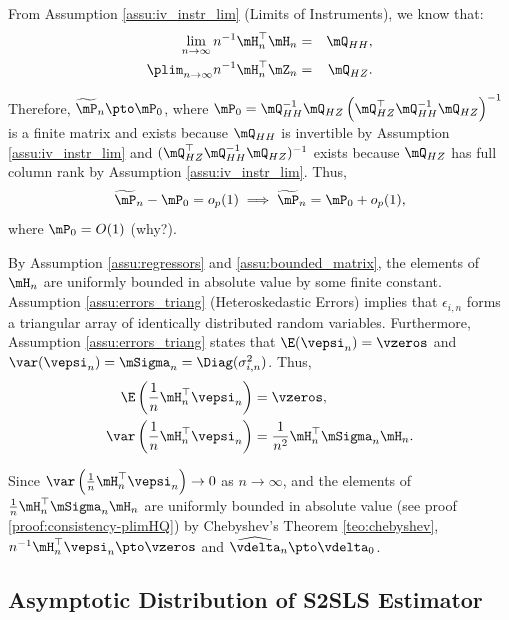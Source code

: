 \documentclass[english,12pt]{book}\usepackage[]{graphicx}\usepackage[]{xcolor}
\begin{document}
From Assumption \ref{assu:iv_instr_lim} (Limits of Instruments), we know that:
\begin{eqnarray*}
\lim_{n\to \infty} n^{-1}\mH_n^\top\mH_n &=& \mQ_{HH},\\
\plim_{n\to \infty} n^{-1}\mH_n^\top\mZ_n &=& \mQ_{HZ}.
\end{eqnarray*}

Therefore,  $\widetilde{\mP}_n\pto \mP_0$, where $\mP_0=\mQ_{HH}^{-1}\mQ_{HZ}\left(\mQ_{HZ}^\top\mQ_{HH}^{-1}\mQ_{HZ}\right)^{-1}$ is a finite matrix and exists because $\mQ_{HH}$ is invertible by Assumption \ref{assu:iv_instr_lim} and $(\mQ_{HZ}^\top\mQ_{HH}^{-1}\mQ_{HZ})^{-1}$ exists because $\mQ_{HZ}$ has full column rank by Assumption \ref{assu:iv_instr_lim}. Thus,
\begin{equation}\label{eq:P_conver}
\widetilde{\mP}_n - \mP_0 = o_p(1)\implies \widetilde{\mP}_n= \mP_0 + o_p(1), 
\end{equation}
%
where $\mP_0 = O(1)$ (why?).

By Assumption \ref{assu:regressors} and \ref{assu:bounded_matrix}, the elements of $\mH_n$ are uniformly bounded in absolute value by some finite constant. Assumption \ref{assu:errors_triang} (Heteroskedastic Errors) implies that $\epsilon_{i,n}$ forms a triangular array of identically distributed random variables. Furthermore, Assumption \ref{assu:errors_triang} states that  $\E(\vepsi_n) = \vzeros$ and $\var(\vepsi_n) = \mSigma_n =\Diag(\sigma^2_{i, n})$. Thus,
\begin{equation*}
  \begin{aligned}
    \E\left(\frac{1}{n}\mH^\top_n\vepsi_n\right)   & = \vzeros, \\
    \var\left(\frac{1}{n}\mH^\top_n\vepsi_n\right) & = \frac{1}{n^2}\mH^\top_n\mSigma_n\mH_n.
  \end{aligned}
\end{equation*}

Since $\var\left(\frac{1}{n}\mH^\top_n\vepsi_n\right)\to 0$ as $n\to \infty$,  and the elements of $\frac{1}{n}\mH_n^\top\mSigma_n\mH_n$ are uniformly bounded in absolute value (see proof \ref{proof:consistency-plimHQ}) by Chebyshev's Theorem \ref{teo:chebyshev}, $n^{-1}\mH^\top_n\vepsi_n\pto \vzeros$ and $\widehat{\vdelta}_n\pto \vdelta_0$.


\subsection{Asymptotic Distribution of S2SLS Estimator}
\end{document}
